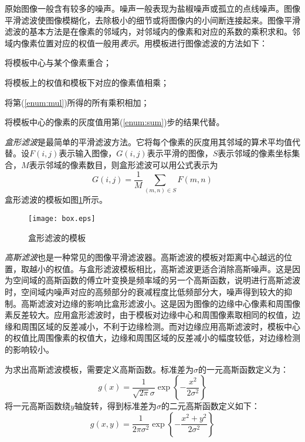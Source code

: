 原始图像一般含有较多的噪声。噪声一般表现为盐椒噪声或孤立的点线噪声。图像平滑滤波使图像模糊化，去除极小的细节或将图像内的小间断连接起来。图像平滑滤波的基本方法是在像素的邻域内，对邻域内的像素和对应的系数的乘积求和。邻域内像素位置对应的权值一般用\emph{表示}。用模板进行图像滤波的方法如下：
\begin{asparaenum}[(1)]
\item 将模板中心与某个像素重合；
\item\label{enum:mul} 将模板上的权值和模板下对应的像素值相乘；
\item\label{enum:sum} 将第(\ref{enum:mul})所得的所有乘积相加；
\item 将模板中心的像素的灰度值用第(\ref{enum:sum})步的结果代替。
\end{asparaenum}


\emph{盒形滤波}是最简单的平滑滤波方法。它将每个像素的灰度用其邻域的算术平均值代替。设$F(i,j)$表示输入图像，$G(i,j)$表示平滑的图像，$S$表示邻域的像素坐标集合，$M$表示邻域的像素数目，则盒形滤波可以用公式表示为
\begin{equation}
  G(i,j)=\frac{1}{M}\sum_{(m,n)\in S}F(m,n)
\end{equation}
盒形滤波的模板如图\ref{fig:box}所示。
\begin{figure}[!h]
  \centering
  \texttt{[image: box.eps]}
  \caption{盒形滤波的模板}
  \label{fig:box}
\end{figure}

\emph{高斯滤波}也是一种常见的图像平滑滤波器。高斯滤波的模板对距离中心越远的位置，取越小的权值。与盒形滤波模板相比，高斯滤波更适合消除高斯噪声。这是因为空间域的高斯函数的傅立叶变换是频率域的另一个高斯函数，说明进行高斯滤波时，空间域内噪声对应的高频部分的衰减程度比低频部分大，噪声得到较大的抑制。高斯滤波对边缘的影响比盒形滤波小。这是因为图像的边缘中心像素和周围像素反差较大。应用盒形滤波时，由于模板对边缘中心和周围像素取相同的权值，边缘和周围区域的反差减小，不利于边缘检测。而对边缘应用高斯滤波时，模板中心的权值比周围像素的权值大，边缘和周围区域的反差减小的幅度较低，对边缘检测的影响较小。

为求出高斯滤波模板，需要定义高斯函数。标准差为$\sigma$的一元高斯函数定义为：
\begin{equation}
  \label{eq:gauss1}
  g(x)=\frac{1}{\sqrt{2\pi}\sigma}\exp\left\{-\frac{x^2}{2\sigma^2}\right\}
\end{equation}
将一元高斯函数绕$y$轴旋转，得到标准差为$\sigma$的二元高斯函数定义如下：
\begin{equation}
  \label{eq:gauss2}
  g(x,y)=\frac{1}{2\pi\sigma^2}\exp\left\{-\frac{x^2+y^2}{2\sigma^2}\right\}
\end{equation}

